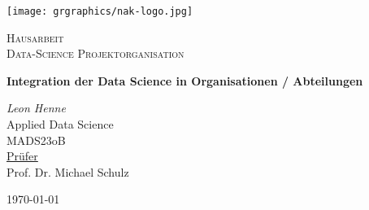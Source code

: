 \begin{titlepage}
	\centering
	\texttt{[image: grgraphics/nak-logo.jpg]}\par\vspace{1cm}
	\vspace{1cm}
	{\scshape\Large Hausarbeit \\ Data-Science Projektorganisation\par}
	\vspace{1.5cm}
	{\huge\bfseries Integration der Data Science in Organisationen / Abteilungen \par}
	\vspace{10mm}
	{\Large\itshape Leon Henne\\}
	\vspace{10mm}
  {\Large Applied Data Science \\ \vspace{1mm} \large MADS23oB}
  \vspace{20mm}\\
	\underline{Prüfer} \\
  \vspace{3mm}
	\large  Prof. Dr. Michael Schulz

	\vfill

	{\large \today\par}

\end{titlepage}